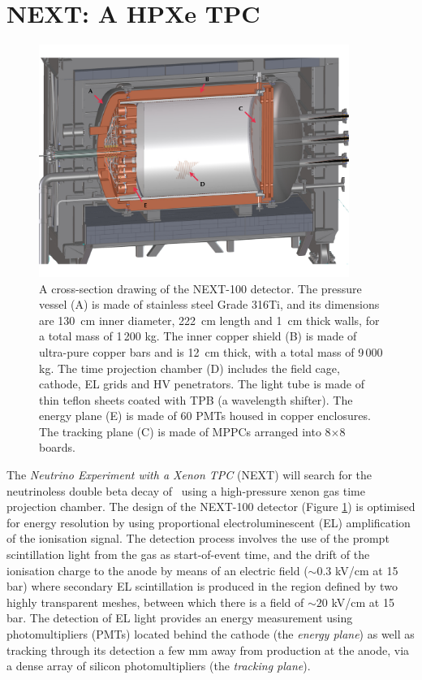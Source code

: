 \section{NEXT: A HPXe TPC}

\begin{figure}
\centering
\includegraphics[width=0.9\textwidth]{img/Next100.pdf}
\caption{A cross-section drawing of the NEXT-100 detector. The pressure vessel (A) is made of stainless steel Grade 316Ti, and its dimensions are 130~cm inner diameter, 222~cm length and 1~cm thick walls, for a total mass of 1\,200 kg. The inner copper shield (B) is made of ultra-pure copper bars and is 12~cm thick, with a total mass of 9\,000 kg. The time projection chamber (D) includes the field cage, cathode, EL grids and HV penetrators. The light tube is made of thin teflon sheets coated with TPB (a wavelength shifter). The energy plane (E) is made of 60 PMTs housed in copper enclosures. The tracking plane (C) is made of MPPCs arranged into 8$\times$8 boards.} \label{fig.NEXT100}
\end{figure}

The \emph{Neutrino Experiment with a Xenon TPC} (NEXT) \cite{Gomez-Cadenas:2013lta} will search for the neutrinoless double beta decay of \XE\ using a high-pressure xenon gas time projection chamber. The design of the NEXT-100 detector (Figure \ref{fig.NEXT100}) is optimised for energy resolution by using proportional electroluminescent (EL) amplification of the ionisation signal. The detection process involves the use of the prompt scintillation light from the gas as start-of-event time, and the drift of the ionisation charge to the anode by means of an electric field ($\sim0.3$ kV/cm at 15 bar) where secondary EL scintillation is produced in the region defined by two highly transparent meshes, between which there is a field of $\sim20$ kV/cm at 15 bar. The detection of EL light provides an energy measurement using photomultipliers (PMTs) located behind the cathode (the \emph{energy plane}) as well as tracking through its detection a few mm away from production at the anode, via a dense array of silicon photomultipliers (the \emph{tracking plane}).

